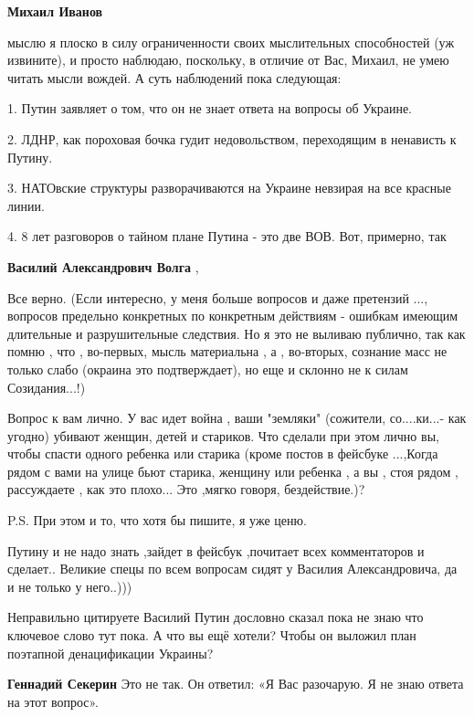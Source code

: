 \begin{itemize}
\begin{itemize}
\textbf{Михаил Иванов} 

мыслю я плоско в силу ограниченности своих мыслительных способностей (уж
извините), и просто наблюдаю, поскольку, в отличие от Вас, Михаил, не умею
читать мысли вождей. А суть наблюдений пока следующая: 

1. Путин заявляет о том, что он не знает ответа на вопросы об Украине. 

2. ЛДНР, как пороховая бочка гудит недовольством, переходящим в ненависть к
Путину. 

3. НАТОвские структуры разворачиваются на Украине невзирая на все красные линии. 

4. 8 лет разговоров о тайном плане Путина - это две ВОВ. Вот, примерно, так


\textbf{Василий Александрович Волга} ,

Все верно. (Если интересно, у меня больше вопросов и даже претензий ...,
вопросов предельно конкретных по конкретным действиям - ошибкам имеющим
длительные и разрушительные следствия. Но я это не выливаю публично, так как
помню , что , во-первых, мысль материальна , а , во-вторых, сознание масс не
только слабо (окраина это подтверждает), но еще и склонно не к силам
Созидания...!)

Вопрос к вам лично. У вас идет война , ваши "земляки" (сожители, со....ки...-
как угодно) убивают женщин, детей и стариков. Что сделали при этом лично вы,
чтобы спасти одного ребенка или старика (кроме постов в фейсбуке ...,Когда
рядом с вами на улице бьют старика, женщину или ребенка , а вы , стоя рядом ,
рассуждаете , как это плохо... Это ,мягко говоря, бездействие.)?

P.S. При этом и то, что хотя бы пишите, я уже ценю.

\end{itemize} %


Путину и не надо знать ,зайдет в фейсбук ,почитает всех комментаторов и
сделает.. Великие спецы по всем вопросам сидят у Василия Александровича, да и
не только у него..)))


Неправильно цитируете Василий Путин дословно сказал пока не знаю что ключевое
слово тут пока. А что вы ещё хотели? Чтобы он выложил план поэтапной
денацификации Украины?

\begin{itemize} %
\textbf{Геннадий Секерин} Это не так. Он ответил: «Я Вас разочарую. Я не знаю ответа на этот вопрос».


\end{itemize}
\end{itemize}
